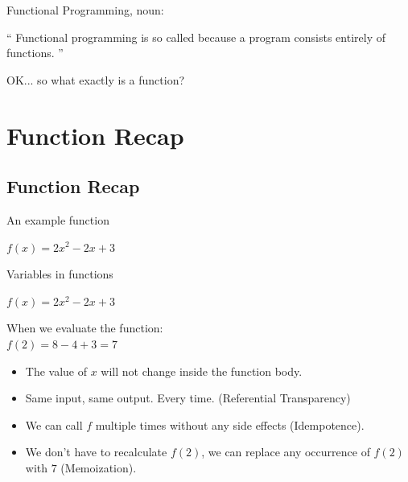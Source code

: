 \documentclass[mathserif]{beamer}
\begin{document}
\begin{frame}{Functional Programming, noun:}

\begin{exampleblock}{}
  {\Large ``
  Functional programming is so called because a program consists entirely of \alert{functions}.
  ''}
  \vskip5mm
  \hspace*{}
\end{exampleblock}
\end{frame}

\begin{frame}{}

  {\Large OK... so what exactly is a \alert{function}?}

\end{frame}

\section{Function Recap}
\subsection{Function Recap}

\begin{frame}{An example function}

  {\Huge $f(x) = 2x^2 - 2x + 3$}


\end{frame}

\begin{frame}{Variables in functions}

  {\Huge $f(x) = 2x^2 - 2x + 3$}

  \vskip5mm

When we evaluate the function:\\
$f(2) = 8 - 4 + 3 = 7$

  \begin{itemize}[<+->]
    \item The value of $x$ will not change inside the function body.
    \item Same input, same output. Every time. (Referential Transparency)
    \item We can call $f$ multiple times without any side effects (Idempotence).
    \item We don't have to recalculate $f(2)$, we can replace any
      occurrence of $f(2)$ with $7$ (Memoization).
  \end{itemize}
\end{frame}
\end{document}
